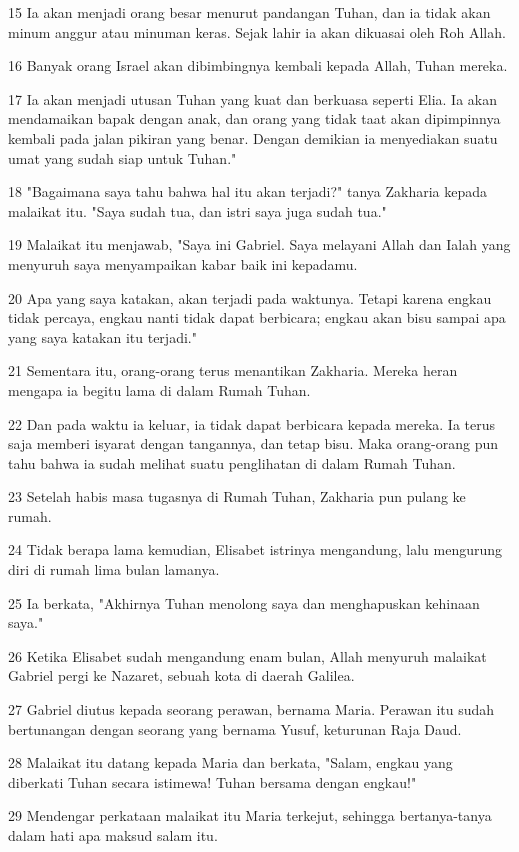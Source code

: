 \par 15 Ia akan menjadi orang besar menurut pandangan Tuhan, dan ia tidak akan minum anggur atau minuman keras. Sejak lahir ia akan dikuasai oleh Roh Allah.
\par 16 Banyak orang Israel akan dibimbingnya kembali kepada Allah, Tuhan mereka.
\par 17 Ia akan menjadi utusan Tuhan yang kuat dan berkuasa seperti Elia. Ia akan mendamaikan bapak dengan anak, dan orang yang tidak taat akan dipimpinnya kembali pada jalan pikiran yang benar. Dengan demikian ia menyediakan suatu umat yang sudah siap untuk Tuhan."
\par 18 "Bagaimana saya tahu bahwa hal itu akan terjadi?" tanya Zakharia kepada malaikat itu. "Saya sudah tua, dan istri saya juga sudah tua."
\par 19 Malaikat itu menjawab, "Saya ini Gabriel. Saya melayani Allah dan Ialah yang menyuruh saya menyampaikan kabar baik ini kepadamu.
\par 20 Apa yang saya katakan, akan terjadi pada waktunya. Tetapi karena engkau tidak percaya, engkau nanti tidak dapat berbicara; engkau akan bisu sampai apa yang saya katakan itu terjadi."
\par 21 Sementara itu, orang-orang terus menantikan Zakharia. Mereka heran mengapa ia begitu lama di dalam Rumah Tuhan.
\par 22 Dan pada waktu ia keluar, ia tidak dapat berbicara kepada mereka. Ia terus saja memberi isyarat dengan tangannya, dan tetap bisu. Maka orang-orang pun tahu bahwa ia sudah melihat suatu penglihatan di dalam Rumah Tuhan.
\par 23 Setelah habis masa tugasnya di Rumah Tuhan, Zakharia pun pulang ke rumah.
\par 24 Tidak berapa lama kemudian, Elisabet istrinya mengandung, lalu mengurung diri di rumah lima bulan lamanya.
\par 25 Ia berkata, "Akhirnya Tuhan menolong saya dan menghapuskan kehinaan saya."
\par 26 Ketika Elisabet sudah mengandung enam bulan, Allah menyuruh malaikat Gabriel pergi ke Nazaret, sebuah kota di daerah Galilea.
\par 27 Gabriel diutus kepada seorang perawan, bernama Maria. Perawan itu sudah bertunangan dengan seorang yang bernama Yusuf, keturunan Raja Daud.
\par 28 Malaikat itu datang kepada Maria dan berkata, "Salam, engkau yang diberkati Tuhan secara istimewa! Tuhan bersama dengan engkau!"
\par 29 Mendengar perkataan malaikat itu Maria terkejut, sehingga bertanya-tanya dalam hati apa maksud salam itu.
